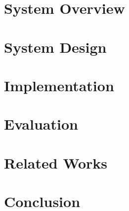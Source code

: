 \section{System Overview}\label{sec:algorithm}


\section{{System Design}}\label{sec:design}


\section{Implementation}\label{sec:implementation}



\section{Evaluation}\label{sec:evaluation}



\section{Related Works}\label{sec:relatedwork}




\section{Conclusion}\label{sec:concluesion}




